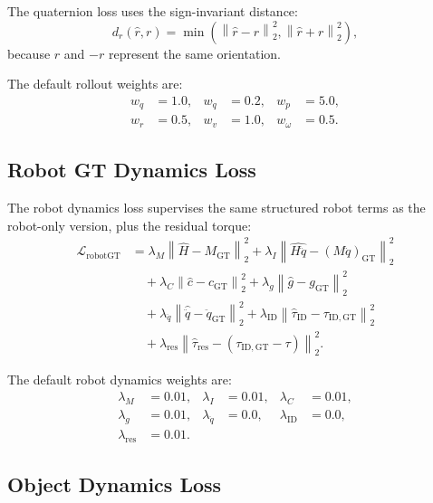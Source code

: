 \documentclass[11pt]{article}
\begin{document}
The quaternion loss uses the sign-invariant distance:
\begin{equation}
  d_r(\hat{r},r)
  =
  \min
  \left(
    \left\|\hat{r} - r\right\|_2^2,
    \left\|\hat{r} + r\right\|_2^2
  \right),
\end{equation}
because \(r\) and \(-r\) represent the same orientation.

The default rollout weights are:
\begin{align}
  w_q &= 1.0, &
  w_{\dot{q}} &= 0.2, &
  w_p &= 5.0, \\
  w_r &= 0.5, &
  w_v &= 1.0, &
  w_{\omega} &= 0.5.
\end{align}

\subsection{Robot GT Dynamics Loss}

The robot dynamics loss supervises the same structured robot terms as the
robot-only version, plus the residual torque:
\begin{align}
  \mathcal{L}_{\mathrm{robotGT}}
  &=
  \lambda_M
  \left\|
    \hat{H} - M_{\mathrm{GT}}
  \right\|_2^2
  +
  \lambda_I
  \left\|
    \widehat{H\ddot{q}} - (M\ddot{q})_{\mathrm{GT}}
  \right\|_2^2 \nonumber \\
  &\quad+
  \lambda_C
  \left\|
    \hat{c} - c_{\mathrm{GT}}
  \right\|_2^2
  +
  \lambda_g
  \left\|
    \hat{g} - g_{\mathrm{GT}}
  \right\|_2^2 \nonumber \\
  &\quad+
  \lambda_{\ddot{q}}
  \left\|
    \hat{\ddot{q}} - \ddot{q}_{\mathrm{GT}}
  \right\|_2^2
  +
  \lambda_{\mathrm{ID}}
  \left\|
    \hat{\tau}_{\mathrm{ID}} - \tau_{\mathrm{ID,GT}}
  \right\|_2^2 \nonumber \\
  &\quad+
  \lambda_{\mathrm{res}}
  \left\|
    \hat{\tau}_{\mathrm{res}} -
    \left(
      \tau_{\mathrm{ID,GT}} - \tau
    \right)
  \right\|_2^2.
\end{align}

The default robot dynamics weights are:
\begin{align}
  \lambda_M &= 0.01, &
  \lambda_I &= 0.01, &
  \lambda_C &= 0.01, \\
  \lambda_g &= 0.01, &
  \lambda_{\ddot{q}} &= 0.0, &
  \lambda_{\mathrm{ID}} &= 0.0, \\
  \lambda_{\mathrm{res}} &= 0.01.
\end{align}

\subsection{Object Dynamics Loss}
\end{document}

